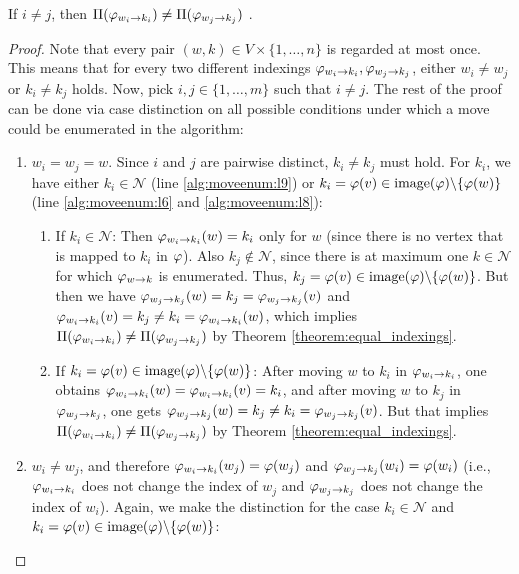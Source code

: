 \begin{samepage}
    \begin{lemmarep}
        If $i \neq j$, then $\Pi(\varphi_{w_i\rightarrow k_i}) \neq \Pi(\varphi_{w_j\rightarrow k_j})$ . \label{lemma:pairwise_distinctiveness}
    \end{lemmarep}
\end{samepage}
\begin{proof}
    Note that every pair $(w,k) \in V \times \{1,\dots,n\}$ is regarded at most once. This means that for every two different indexings $\varphi_{w_i\rightarrow k_i},\varphi_{w_j\rightarrow k_j}$, either $w_i \neq w_j$ or $k_i \neq k_j$ holds. Now, pick $i,j \in \{1,\dots,m\}$ such that $i \neq j$. The rest of the proof can be done via case distinction on all possible conditions under which a move could be enumerated in the algorithm:
    \begin{enumerate}
        \item $w_i = w_j = w$. Since $i$ and $j$ are pairwise distinct, $k_i \neq k_j$ must hold. For $k_i$, we have either $k_i \in \mathcal{N}$ (line \ref{alg:moveenum:l9}) or $k_i = \varphi(v) \in \mathrm{image}(\varphi)\backslash \{ \varphi(w) \}$ (line \ref{alg:moveenum:l6} and \ref{alg:moveenum:l8}):
        \begin{enumerate}
            \item If $k_i \in \mathcal{N}$: Then $\varphi_{w_i\rightarrow k_i}(w) = k_i$ only for $w$ (since there is no vertex that is mapped to $k_i$ in $\varphi$). Also $k_j \not\in \mathcal{N}$, since there is at maximum one $k \in \mathcal{N}$ for which $\varphi_{w\rightarrow k}$ is enumerated. Thus, $k_j = \varphi(v) \in \mathrm{image}(\varphi)\backslash \{ \varphi(w) \}$. But then we have $\varphi_{w_j\rightarrow k_j}(w) = k_j =\varphi_{w_j\rightarrow k_j}(v)$ and $\varphi_{w_i\rightarrow k_i}(v) = k_j \neq k_i = \varphi_{w_i\rightarrow k_i}(w)$, which implies $\Pi(\varphi_{w_i\rightarrow k_i}) \neq \Pi(\varphi_{w_j\rightarrow k_j})$ by Theorem \ref{theorem:equal_indexings}.
            \item If $k_i = \varphi(v) \in \mathrm{image}(\varphi)\backslash \{\varphi(w) \}$: After moving $w$ to $k_i$ in $\varphi_{w_i\rightarrow k_i}$, one obtains $\varphi_{w_i\rightarrow k_i}(w) = \varphi_{w_i\rightarrow k_i}(v) = k_i$, and after moving $w$ to $k_j$ in $\varphi_{w_j\rightarrow k_j}$, one gets $\varphi_{w_j\rightarrow k_j}(w) = k_j \neq k_i = \varphi_{w_j\rightarrow k_j}(v)$. But that implies $\Pi(\varphi_{w_i\rightarrow k_i}) \neq \Pi(\varphi_{w_j\rightarrow k_j})$ by Theorem \ref{theorem:equal_indexings}.  
        \end{enumerate}
        \item $w_i \neq w_j$, and therefore $\varphi_{w_i\rightarrow k_i}(w_j) = \varphi(w_j)$ and $\varphi_{w_j\rightarrow k_j}(w_i) = \varphi(w_i)$ (i.e., $\varphi_{w_i\rightarrow k_i}$ does not change the index of $w_j$ and $\varphi_{w_j\rightarrow k_j}$ does not change the index of $w_i$). Again, we make the distinction for the case $k_i \in \mathcal{N}$ and $k_i = \varphi(v) \in \mathrm{image}(\varphi)\backslash \{ \varphi(w) \}$:

\end{enumerate}
\end{proof}
